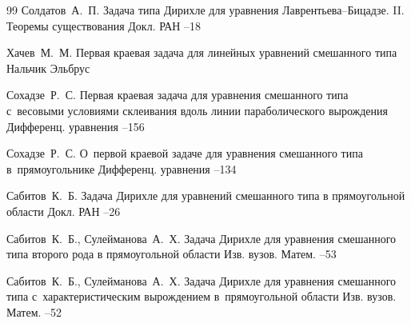 \begin{thebibliography}{99}
\by Солдатов~А.~П.
\paper Задача типа Дирихле для уравнения Лаврентьева--Бицадзе. II. Теоремы существования
\jour Докл. РАН
--18

\by Хачев~М.~М.
\book Первая краевая задача для линейных уравнений смешанного типа
\publaddr Нальчик
\publ Эльбрус

 \by Сохадзе~Р.~С.
\paper Первая краевая задача для уравнения смешанного типа с~весовыми условиями склеивания 
вдоль линии параболического вырождения
\jour Дифференц. уравнения
--156

\by Сохадзе~Р.~С.
\paper О~первой краевой задаче для уравнения смешанного типа в~прямоугольнике
\jour Дифференц. уравнения
--134



\by Сабитов~К.~Б.
\paper Задача Дирихле для уравнений смешанного типа в прямоугольной области
\jour Докл. РАН
--26

\by Сабитов~К.~Б., Сулейманова~А.~Х.
\paper Задача Дирихле для уравнения смешанного типа второго рода
в прямоугольной области
\jour Изв. вузов. Матем.
--53

\by Сабитов~К.~Б., Сулейманова~А.~Х.
\paper Задача Дирихле для уравнения смешанного типа с~характеристическим вырождением в~прямоугольной области
\jour Изв. вузов. Матем.
--52


\end{thebibliography}
